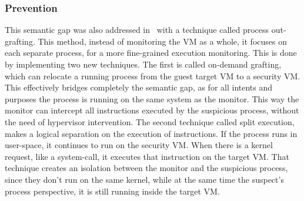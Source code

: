 \subsubsection{Prevention}

\par This semantic gap was also addressed in~\cite{srinivasan2011process} with a technique called process out-grafting. This method, instead of monitoring the \ac{VM} as a whole, it focuses on each separate process, for a more fine-grained execution monitoring. This is done by implementing two new techniques. The first is called on-demand grafting, which can relocate a running process from the guest target \ac{VM} to a security \ac{VM}. This effectively bridges completely the semantic gap, as for all intents and purposes the process is running on the same system as the monitor. This way the monitor can intercept all instructions executed by the suspicious process, without the need of hypervisor intervention. The second technique called split execution, makes a logical separation on the execution of instructions. If the process runs in user-space, it continues to run on the security \ac{VM}. When there is a kernel request, like a system-call, it executes that instruction on the target \ac{VM}. That technique creates an isolation between the monitor and the suspicious process, since they don’t run on the same kernel, while at the same time the suspect’s process perspective, it is still running inside the target \ac{VM}. 

